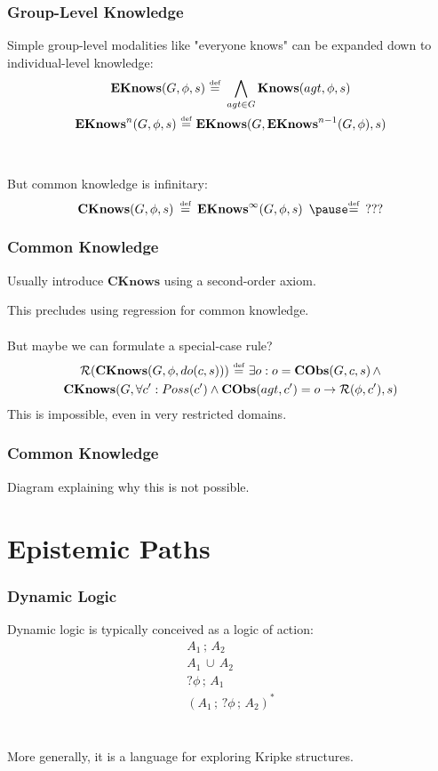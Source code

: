 \documentclass[compress]{beamer}
\newcommand{\isdef}{\hbox{$\stackrel{\mbox{\tiny def}}{=}$}}
\newcommand{\Reg}{\mathcal{R}}
\newcommand{\EKnows}{\mathbf{EKnows}}
\newcommand{\Knows}{\mathbf{Knows}}
\newcommand{\CKnows}{\mathbf{CKnows}}
\begin{document}
\begin{frame}
\frametitle{Group-Level Knowledge}
Simple group-level modalities like "everyone knows" can be expanded down to individual-level knowledge:
\begin{gather*}
\EKnows(G,\phi,s)\,\,\isdef\,\,\bigwedge_{agt \in G} \Knows(agt,\phi,s)\\
\EKnows^{n}(G,\phi,s)\,\,\isdef\,\,\EKnows(G,\EKnows^{n-1}(G,\phi),s)
\end{gather*}
\ \\
\ \\
\pause
But common knowledge is infinitary:
\begin{equation*}
\CKnows(G,\phi,s)\,\,\,\isdef\,\,\,\EKnows^{\infty}(G,\phi,s)\,\,\,\pause \isdef\,\,\,???
\end{equation*}
\end{frame}

\begin{frame}
\frametitle{Common Knowledge}
Usually introduce $\CKnows$ using a second-order axiom.

This precludes using regression for common knowledge.
\ \\
\ \\
\pause
But maybe we can formulate a special-case rule?
\begin{multline*}
\Reg(\CKnows(G,\phi,do(c,s)))\,\,\isdef\,\,\exists o: o = \mathbf{CObs}(G,c,s)\,\wedge \\
  \CKnows(G,\forall c': Poss(c')\wedge \mathbf{CObs}(agt,c')=o \rightarrow \Reg(\phi,c'),s)
\end{multline*}
\pause
This is \alert{impossible}, even in very restricted domains.
\end{frame}

\begin{frame}
\frametitle{Common Knowledge}
Diagram explaining why this is not possible.
\end{frame}

\section{Epistemic Paths}

\begin{frame}
\frametitle{Dynamic Logic}
Dynamic logic is typically conceived as a logic of action:
\begin{gather*}
A_1\,;\,A_2 \\
A_1\,\cup\,A_2 \\
?\phi\,;\,A_1 \\
(A_1\,;\,?\phi\,;\,A_2)^*
\end{gather*}
\ \\
\ \\
More generally, it is a language for exploring Kripke structures.
\end{frame}
\end{document}

